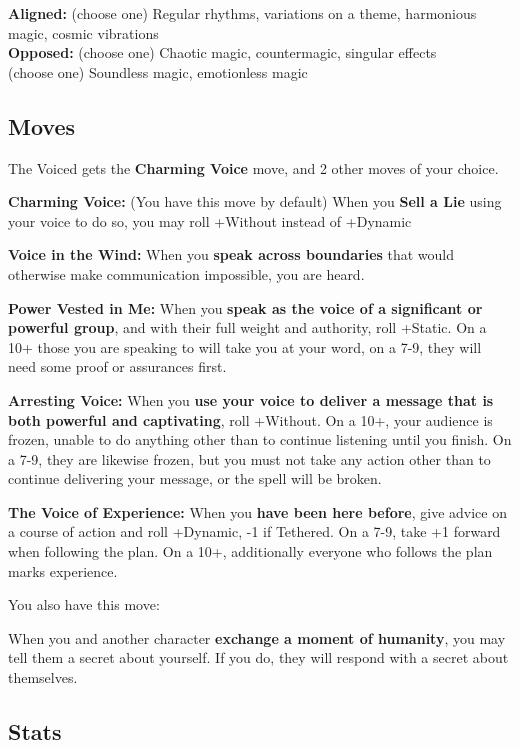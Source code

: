 \documentclass[
  oneside,
  statementpaper,
  9pt]{memoir}
\begin{document}
\textbf{Aligned:} (choose one) Regular rhythms, variations on a theme,
harmonious magic, cosmic vibrations\\
\textbf{Opposed:} (choose one) Chaotic magic, countermagic, singular
effects\\
(choose one) Soundless magic, emotionless magic

\hypertarget{moves-7}{%
\subsection{Moves}\label{moves-7}}

The Voiced gets the \textbf{Charming Voice} move, and 2 other moves of
your choice.

\textbf{Charming Voice:} (You have this move by default) When you
\textbf{Sell a Lie} using your voice to do so, you may roll +Without
instead of +Dynamic

\textbf{Voice in the Wind:} When you \textbf{speak across boundaries}
that would otherwise make communication impossible, you are heard.

\textbf{Power Vested in Me:} When you \textbf{speak as the voice of a
significant or powerful group}, and with their full weight and
authority, roll +Static. On a 10+ those you are speaking to will take
you at your word, on a 7-9, they will need some proof or assurances
first.

\textbf{Arresting Voice:} When you \textbf{use your voice to deliver a
message that is both powerful and captivating}, roll +Without. On a 10+,
your audience is frozen, unable to do anything other than to continue
listening until you finish. On a 7-9, they are likewise frozen, but you
must not take any action other than to continue delivering your message,
or the spell will be broken.

\textbf{The Voice of Experience:} When you \textbf{have been here
before}, give advice on a course of action and roll +Dynamic, -1 if
Tethered. On a 7-9, take +1 forward when following the plan. On a 10+,
additionally everyone who follows the plan marks experience.

You also have this move:

When you and another character \textbf{exchange a moment of humanity},
you may tell them a secret about yourself. If you do, they will respond
with a secret about themselves.

\hypertarget{stats-9}{%
\subsection{Stats}\label{stats-9}}
\end{document}
